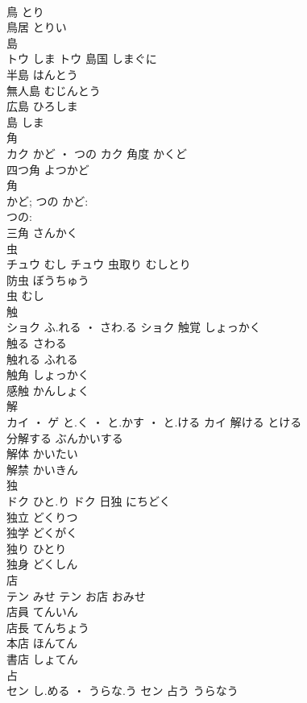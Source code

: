\documentclass[8pt]{extreport}
\begin{document}
\begin{CJK}{UTF8}{min}
\\	鳥	とり	
\\	鳥居	とりい	
\\	島	
\\	トウ	しま	トウ	島国	しまぐに	
\\	半島	はんとう	
\\	無人島	むじんとう	
\\	広島	ひろしま	
\\	島	しま	
\\	角	
\\	カク	かど ・ つの	カク	角度	かくど	
\\	四つ角	よつかど	
\\	角 
\\	かど; つの	かど: 
\\	つの: 
\\	三角	さんかく	
\\	虫	
\\	チュウ	むし	チュウ	虫取り	むしとり	
\\	防虫	ぼうちゅう	
\\	虫	むし	
\\	触	
\\	ショク	ふ.れる ・ さわ.る	ショク	触覚	しょっかく	
\\	触る	さわる	
\\	触れる	ふれる	
\\	触角	しょっかく	
\\	感触	かんしょく	
\\	解	
\\	カイ ・ ゲ	と.く ・ と.かす ・ と.ける	カイ	解ける	とける	
\\	分解する	ぶんかいする	
\\	解体	かいたい	
\\	解禁	かいきん	
\\	独	
\\	ドク	ひと.り	ドク	日独	にちどく	
\\	独立	どくりつ	
\\	独学	どくがく	
\\	独り	ひとり	
\\	独身	どくしん	
\\	店	
\\	テン	みせ	テン	お店	おみせ	
\\	店員	てんいん	
\\	店長	てんちょう	
\\	本店	ほんてん	
\\	書店	しょてん	
\\	占	
\\	セン	し.める ・ うらな.う	セン	占う	うらなう	

\end{CJK}
\end{document}

